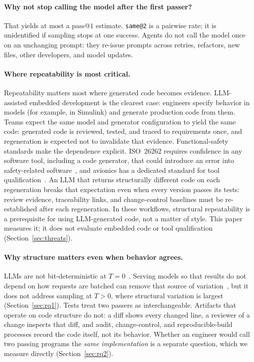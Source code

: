 \documentclass[acmsmall,screen,review,anonymous]{acmart}
\makeatletter
\newcommand{\sameat}{\mbox{\texttt{same@2}}}
\makeatother
\begin{document}
\paragraph{Why not stop calling the model after the first passer?}
That yields at most a pass@$1$ estimate.
\sameat{} is a pairwise rate; it is unidentified if sampling stops at one
success.
Agents do not call the model once on an unchanging prompt: they re-issue prompts
across retries, refactors, new files, other developers, and model updates.

\paragraph{Where repeatability is most critical.}
Repeatability matters most where generated code becomes evidence.
LLM-assisted embedded development is the clearest case: engineers specify
behavior in models (for example, in Simulink) and generate production code
from them.
Teams expect the same model and generator configuration to yield the same
code: generated code is reviewed, tested, and traced to requirements once, and
regeneration is expected not to invalidate that evidence.
Functional-safety standards make the dependence explicit.
ISO~26262 requires confidence in any software tool, including a code
generator, that could introduce an error into safety-related
software~\cite[Clause~11]{iso26262part8}, and avionics has a dedicated standard for tool
qualification~\cite{rtca2011do330}.
An LLM that returns structurally different code on each regeneration breaks
that expectation even when every version passes its tests: review evidence,
traceability links, and change-control baselines must be re-established after
each regeneration.
In these workflows, structural repeatability is a prerequisite for using
LLM-generated code, not a matter of style.
This paper measures it; it does not evaluate embedded code or tool
qualification (Section~\ref{sec:threats}).

\paragraph{Why structure matters even when behavior agrees.}
LLMs are not bit-deterministic at
$T{=}0$~\cite{ouyang2023llm}.
Serving models so that results do not depend on how requests are batched
can remove that source of variation~\cite{he2025nondeterminism}, but it does not address sampling at
$T{>}0$, where structural variation is largest (Section~\ref{sec:rq1}).
Tests treat two passers as interchangeable.
Artifacts that operate on code structure do not: a diff shows every changed
line, a reviewer of a change inspects that diff, and audit, change-control,
and reproducible-build processes record the code itself, not its behavior.
Whether an engineer would call two passing programs the \emph{same
implementation} is a separate question, which we measure directly
(Section~\ref{sec:rq2}).
\end{document}
